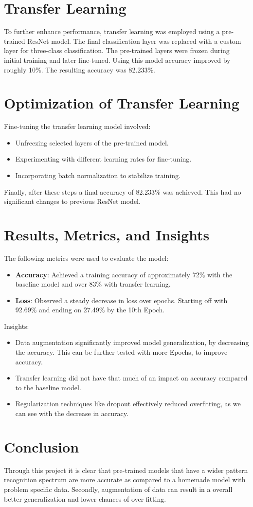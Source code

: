 \documentclass{article}
\begin{document}
\section{Transfer Learning}
To further enhance performance, transfer learning was employed using a pre-trained ResNet model. The final classification layer was replaced with a custom layer for three-class classification. The pre-trained layers were frozen during initial training and later fine-tuned. Using this model accuracy improved by roughly 10\%. The resulting accuracy was 82.233\%.

\section{Optimization of Transfer Learning}
Fine-tuning the transfer learning model involved:
\begin{itemize}
    \item Unfreezing selected layers of the pre-trained model.
    \item Experimenting with different learning rates for fine-tuning.
    \item Incorporating batch normalization to stabilize training.
\end{itemize}
Finally, after these steps a final accuracy of 82.233\% was achieved. This had no significant changes to previous ResNet model. 

\section{Results, Metrics, and Insights}
The following metrics were used to evaluate the model:
\begin{itemize}
    \item \textbf{Accuracy}: Achieved a training accuracy of approximately 72\% with the baseline model and over 83\% with transfer learning.
    \item \textbf{Loss}: Observed a steady decrease in loss over epochs. Starting off with 92.69\% and ending on 27.49\% by the 10th Epoch.
\end{itemize}
Insights:
\begin{itemize}
    \item Data augmentation significantly improved model generalization, by decreasing the accuracy. This can be further tested with more Epochs, to improve accuracy.
    \item Transfer learning did not have that much of an impact on accuracy compared to the baseline model.
    \item Regularization techniques like dropout effectively reduced overfitting, as we can see with the decrease in accuracy.
\end{itemize}

\section{Conclusion}
Through this project it is clear that pre-trained models that have a wider pattern recognition spectrum are more accurate as compared to a homemade model with problem specific data. Secondly, augmentation of data can result in a overall better generalization and lower chances of over fitting.
\end{document}
